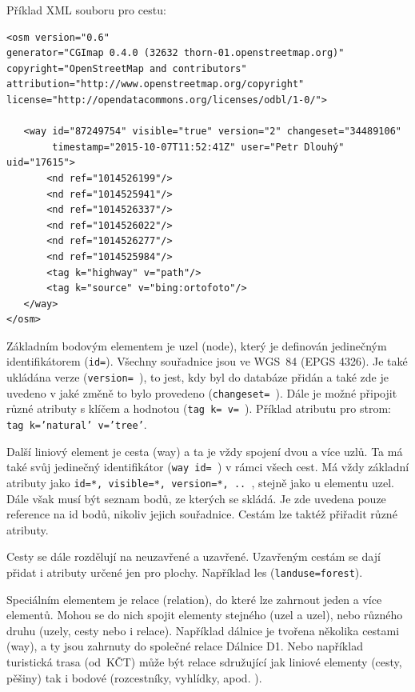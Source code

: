Příklad XML souboru pro cestu:

{\scriptsize
\begin{lstlisting}
<osm version="0.6" 
generator="CGImap 0.4.0 (32632 thorn-01.openstreetmap.org)" 
copyright="OpenStreetMap and contributors" 
attribution="http://www.openstreetmap.org/copyright" license="http://opendatacommons.org/licenses/odbl/1-0/">

   <way id="87249754" visible="true" version="2" changeset="34489106"
        timestamp="2015-10-07T11:52:41Z" user="Petr Dlouhý" uid="17615">
       <nd ref="1014526199"/>
       <nd ref="1014525941"/>
       <nd ref="1014526337"/>
       <nd ref="1014526022"/>
       <nd ref="1014526277"/>
       <nd ref="1014525984"/>
       <tag k="highway" v="path"/>
       <tag k="source" v="bing:ortofoto"/>
   </way>
</osm>
\end{lstlisting}
}


Základním bodovým elementem je uzel (node), který je definován jedinečným
identifikátorem ({\tt id=}). Všechny souřadnice jsou ve WGS~84 (EPGS 4326). 
Je také ukládána verze ({\tt version= }), to jest, kdy byl do databáze přidán
a také zde je uvedeno v jaké změně to bylo provedeno ({\tt changeset=~}).
Dále je možné připojit různé atributy s klíčem a hodnotou ({\tt tag~k=~v=~}).
Příklad atributu pro strom: {\tt tag k='natural' v='tree'}.

Další liniový element je cesta (way) a ta je vždy spojení dvou a více uzlů.
Ta má také svůj jedinečný identifikátor ({\tt way~id=~}) v rámci všech cest.
Má vždy základní atributy jako {\tt id=*, visible=*, version=*, .. }, 
stejně jako u elementu uzel.
Dále však musí být seznam bodů, ze kterých se skládá.
Je zde uvedena pouze reference na id bodů, nikoliv jejich souřadnice.
Cestám lze taktéž přiřadit různé atributy.

Cesty se dále rozdělují na neuzavřené a uzavřené. Uzavřeným cestám se dají přidat
i atributy určené jen pro plochy. Například les ({\tt landuse=forest}).

Speciálním elementem je relace (relation), do které lze zahrnout
jeden a více elementů. Mohou se do nich spojit elementy stejného (uzel a uzel),
nebo různého druhu (uzely, cesty nebo i relace). 
Například dálnice je tvořena několika cestami (way), a ty
jsou zahrnuty do společné relace Dálnice D1. Nebo například turistická trasa
(od~KČT) může být relace sdružující jak liniové elementy (cesty, pěšiny) tak i bodové
(rozcestníky, vyhlídky, apod. ).

